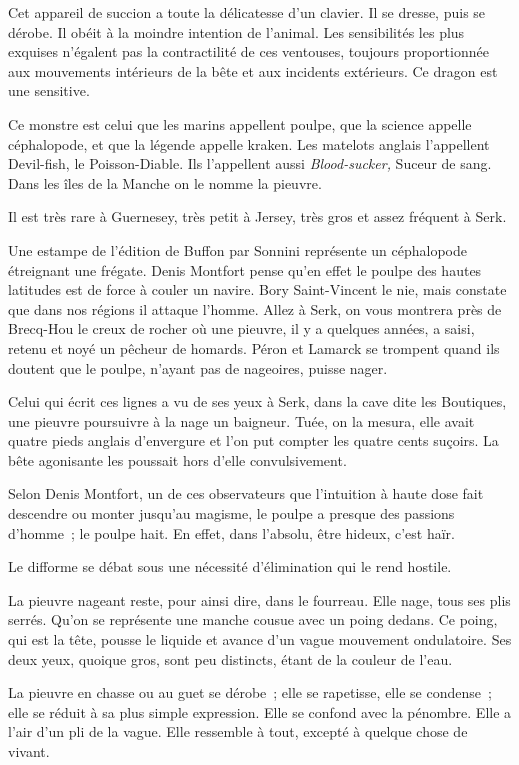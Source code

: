 \documentclass[french,twoside]{book} %
\begin{document}
Cet appareil de succion a toute la délicatesse d’un clavier. Il se dresse, puis se dérobe. Il obéit à la moindre intention de l’animal. Les sensibilités les plus exquises n’égalent pas la contractilité de ces ventouses, toujours proportionnée aux mouvements intérieurs de la bête et aux incidents extérieurs. Ce dragon est une sensitive.\par
Ce monstre est celui que les marins appellent poulpe, que la science appelle céphalopode, et que la légende appelle kraken. Les matelots anglais l’appellent Devil-fish, le Poisson-Diable. Ils l’appellent aussi \emph{Blood-sucker,} Suceur de sang. Dans les îles de la Manche on le nomme la pieuvre.\par
Il est très rare à Guernesey, très petit à Jersey, très gros et assez fréquent à Serk.\par
Une estampe de l’édition de Buffon par Sonnini représente un céphalopode étreignant une frégate. Denis Montfort pense qu’en effet le poulpe des hautes  latitudes est de force à couler un navire. Bory Saint-Vincent le nie, mais constate que dans nos régions il attaque l’homme. Allez à Serk, on vous montrera près de Brecq-Hou le creux de rocher où une pieuvre, il y a quelques années, a saisi, retenu et noyé un pêcheur de homards. Péron et Lamarck se trompent quand ils doutent que le poulpe, n’ayant pas de nageoires, puisse nager.\par
Celui qui écrit ces lignes a vu de ses yeux à Serk, dans la cave dite les Boutiques, une pieuvre poursuivre à la nage un baigneur. Tuée, on la mesura, elle avait quatre pieds anglais d’envergure et l’on put compter les quatre cents suçoirs. La bête agonisante les poussait hors d’elle convulsivement.\par
Selon Denis Montfort, un de ces observateurs que l’intuition à haute dose fait descendre ou monter jusqu’au magisme, le poulpe a presque des passions d’homme ; le poulpe hait. En effet, dans l’absolu, être hideux, c’est haïr.\par
Le difforme se débat sous une nécessité d’élimination qui le rend hostile.\par
La pieuvre nageant reste, pour ainsi dire, dans le fourreau. Elle nage, tous ses plis serrés. Qu’on se représente une manche cousue avec un poing dedans. Ce poing, qui est la tête, pousse le liquide et avance d’un vague mouvement ondulatoire. Ses deux yeux, quoique gros, sont peu distincts, étant de la couleur de l’eau.\par
La pieuvre en chasse ou au guet se dérobe ; elle se rapetisse, elle se condense ; elle se réduit à sa plus  simple expression. Elle se confond avec la pénombre. Elle a l’air d’un pli de la vague. Elle ressemble à tout, excepté à quelque chose de vivant.\par
\end{document}
